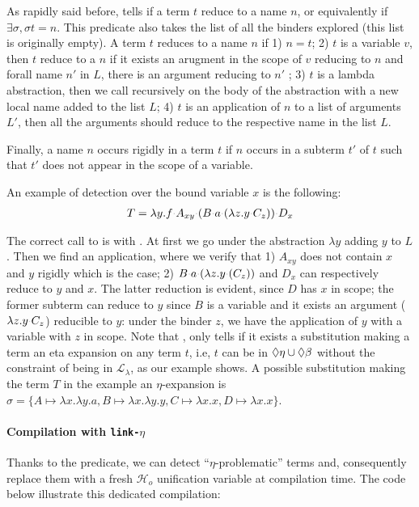 \documentclass[sigconf,natbib=false,review]{acmart}
\newcommand{\appsep}{\ensuremath{\textcolor{lightgray}{\cdot}}}
\newcommand{\llambda}{\ensuremath{\mathcal{L}_\lambda}\xspace}
\newcommand{\linketa}{\texttt{link-}\ensuremath{\eta}\xspace}
\newcommand{\Ho}{\ensuremath{\mathcal{H}_o}\xspace}
\begin{document}
As rapidly said before,  tells if a term $t$ reduce to a
name $n$, or equivalently if $\exists \sigma, \sigma t = n$. This predicate also
takes the list of all the binders explored (this list is originally empty). A
term $t$ reduces to a name $n$ if 1) $n = t$; 2) $t$ is a variable $v$, then $t$
reduce to a $n$ if it exists an arugment in the scope of $v$ reducing to $n$ and
forall name $n'$ in $L$, there is an argument reducing to $n'$ ; 3) $t$
is a lambda abstraction, then we call recursively  on the
body of the abstraction with a new local name added to the list $L$; 4) $t$ is
an application of $n$ to a list of arguments $L'$, then all the arguments should
reduce to the respective name in the list $L$.

Finally, a name $n$ occurs rigidly in a term $t$ if $n$ occurs in a subterm $t'$
of $t$ such that $t'$ does not appear in the scope of a variable.

An example of \maybeeta detection over the bound variable $x$ is the following:
%
\begin{gather}
  T = \lambda y. f \appsep A_{xy} \appsep (B \appsep a \appsep (\lambda z.y\appsep C_z)) \appsep D_x
\end{gather}

The correct call to  is  with
. At first we go under the abstraction $\lambda y$ adding $y$ to
$L$. Then we find an application, where we verify that 1) $A_{xy}$ does not
contain $x$ and $y$ rigidly which is the case; 2) $B \appsep a \appsep (\lambda z.y\appsep (C_z))$
and $D_x$ can respectively reduce to $y$ and $x$. The latter reduction is
evident, since $D$ has $x$ in scope; the former subterm can reduce to $y$ since
$B$ is a variable and it exists an argument ($\lambda z.y\appsep C_z$) reducible to
$y$: under the binder $z$, we have the application of $y$ with a variable with
$z$ in scope. Note that \maybeeta, only tells if it exists a substitution making
a term an eta expansion on any term $t$, i.e, $t$ can be in $\Diamond\eta \cup
\Diamond\beta$ without the constraint of being in \llambda, as our example shows. A
possible substitution making the term $T$ in the example an $\eta$-expansion is
$\sigma = \{A \mapsto \lambda x.\lambda y.a, B \mapsto \lambda x.\lambda y.y,
C \mapsto \lambda x.x, D \mapsto \lambda x.x\}$.

\paragraph{Compilation with \linketa} Thanks to the 
predicate, we can detect ``$\eta$-problematic'' terms and, consequently replace
them with a fresh \Ho unification variable at compilation time. The code
below illustrate this dedicated compilation:
\end{document}
